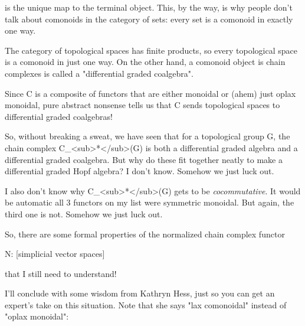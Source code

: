 is the unique map to the terminal object.  This, by the way, is
why people don't talk about comonoids in the category of sets:
every set is a comonoid in exactly one way.

The category of topological spaces has finite products, so every
topological space is a comonoid in just one way.  On the other hand, a
comonoid object is chain complexes is called a "differential
graded coalgebra".

Since C is a composite of functors that are either monoidal or (ahem)
just oplax monoidal, pure abstract nonsense tells us that C sends
topological spaces to differential graded coalgebras!  

So, without breaking a sweat, we have seen that for a topological
group G, the chain complex C_{<sub>*}</sub>(G) is both a
differential graded algebra and a differential graded coalgebra.  But
why do these fit together neatly to make a differential graded Hopf
algebra?  I don't know.  Somehow we just luck out.

I also don't know why C_{<sub>*}</sub>(G) gets to be
\emph{cocommutative}.  It would be automatic all 3 functors on my
list were symmetric monoidal.  But again, the third one is not.
Somehow we just luck out.

So, there are some formal properties of the normalized chain complex
functor

N: [simplicial vector spaces] 

that I still need to understand!  

I'll conclude with some wisdom from Kathryn Hess, just so you can
get an expert's take on this situation.  Note that she says "lax
comonoidal" instead of "oplax monoidal":

